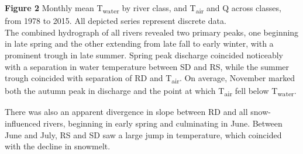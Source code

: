 \documentclass[notitlepage]{article}
\begin{document}
\noindent
\textbf{Figure 2} Monthly mean T\textsubscript{water} by river class, and T\textsubscript{air} and Q across classes, from 1978 to 2015. All depicted series represent discrete data. %
\\[\baselineskip]

The combined hydrograph of all rivers revealed two primary peaks, one beginning in late spring and the other extending from late fall to early winter, with a prominent trough in late summer. Spring peak discharge coincided noticeably with a separation in water temperature between SD and RS, while the summer trough coincided with separation of RD and T\textsubscript{air}. On average, November marked both the autumn peak in discharge and the point at which T\textsubscript{air} fell below T\textsubscript{water}.

There was also an apparent divergence in slope between RD and all snow-influenced rivers, beginning in early spring and culminating in June. Between June and July, RS and SD saw a large jump in temperature, which coincided with the decline in snowmelt.
\end{document}
